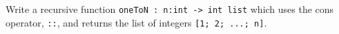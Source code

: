 Write a recursive function \lstinline{oneToN : n:int -> int list} which uses the cons operator, \lstinline{::}, and returns the list of integers \lstinline{[1; 2; ...; n]}.

